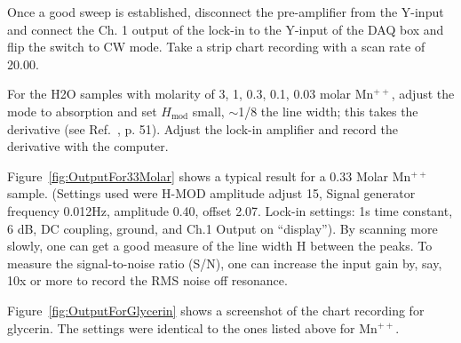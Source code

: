 \documentclass{../lab}
\begin{document}
\newpage

Once a good sweep is established, disconnect the pre-amplifier from the Y-input and connect the Ch. 1 output of the lock-in to the Y-input of the DAQ box and flip the switch to CW mode. Take a strip chart recording with a scan rate of 20.00.

For the H2O samples with molarity of 3, 1, 0.3, 0.1, 0.03 molar Mn$^{++}$, adjust the mode to absorption and set $H_\text{mod}$ small, $\sim$1/8 the line width; this takes the derivative (see Ref.~\cite{Liboff}, p. 51). Adjust the lock-in amplifier and record the derivative with the computer.

Figure~\ref{fig:OutputFor33Molar} shows a typical result for a 0.33 Molar  Mn$^{++}$ sample. (Settings used were H-MOD amplitude adjust 15, Signal generator frequency 0.012Hz, amplitude 0.40, offset 2.07. Lock-in settings: 1s time constant, 6 dB, DC coupling, ground, and Ch.1 Output on ``display''). By scanning more slowly, one can get a good measure of the line width H between the peaks. To measure the signal-to-noise ratio (S/N), one can increase the input gain by, say, 10x or more to record the RMS noise off resonance.

Figure~\ref{fig:OutputForGlycerin} shows a screenshot of the chart recording for glycerin. The settings were identical to the ones listed above for Mn$^{++}$.
\end{document}
